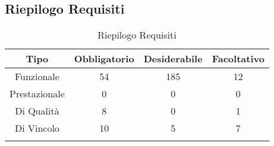 \subsection{Riepilogo Requisiti}
\normalsize
\begin{longtable}{|c|c|c|c|}
\hline 
\textbf{Tipo} & \textbf{Obbligatorio} & \textbf{Desiderabile} & \textbf{Facoltativo}\\
\hline
Funzionale & 54 & 185 & 12\\ \hline
Prestazionale & 0 & 0 & 0\\ \hline
Di Qualità & 8 & 0 & 1\\ \hline
Di Vincolo & 10 & 5 & 7\\ \hline
\caption[Riepilogo Requisiti]{Riepilogo Requisiti}
\label{tabella:riepilogorequi}
\end{longtable}
\clearpage
